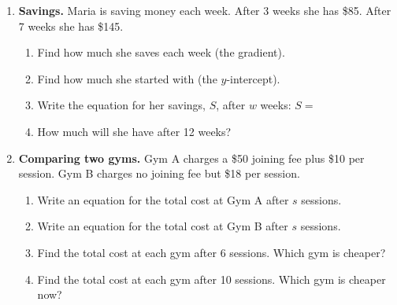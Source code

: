 \documentclass[11pt]{article}
\newcommand{\ans}{\hrulefill}
\begin{document}
\begin{enumerate}
  \item \textbf{Savings.} Maria is saving money each week. After 3 weeks she has \$85. After 7 weeks she has \$145.
  \begin{enumerate}
    \item Find how much she saves each week (the gradient). \ans
    \item Find how much she started with (the $y$-intercept). \ans
    \item Write the equation for her savings, $S$, after $w$ weeks: $S = $ \ans
    \item How much will she have after 12 weeks? \ans
  \end{enumerate}

  \item \textbf{Comparing two gyms.} Gym A charges a \$50 joining fee plus \$10 per session. Gym B charges no joining fee but \$18 per session.
  \begin{enumerate}
    \item Write an equation for the total cost at Gym A after $s$ sessions. \ans
    \item Write an equation for the total cost at Gym B after $s$ sessions. \ans
    \item Find the total cost at each gym after 6 sessions. Which gym is cheaper? \ans
    \item Find the total cost at each gym after 10 sessions. Which gym is cheaper now? \ans
  \end{enumerate}
\end{enumerate}
\end{document}
